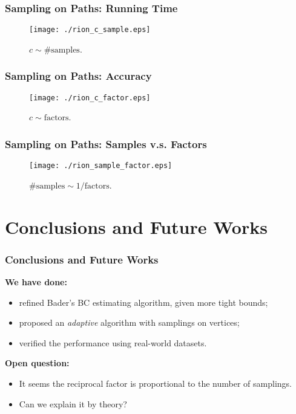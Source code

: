 \documentclass[12pt]{beamer}
\begin{document}
\begin{frame}
	\frametitle{Sampling on Paths: Running Time}
	\begin{figure}
	\texttt{[image: ./rion\_c\_sample.eps]}
\caption{$c \sim \textrm{\# samples}$.}
\end{figure}
\end{frame}

\begin{frame}
	\frametitle{Sampling on Paths: Accuracy}
	\begin{figure}
	\texttt{[image: ./rion\_c\_factor.eps]}
\caption{$c \sim \textrm{factors}$.}
\end{figure}
\end{frame}

\begin{frame}
	\frametitle{Sampling on Paths: Samples v.s. Factors}
	\begin{figure}
	\texttt{[image: ./rion\_sample\_factor.eps]}
\caption{$\textrm{\# samples} \sim 1/\textrm{factors}$.}
\end{figure}
\end{frame}

\section{Conclusions and Future Works}
\begin{frame}
	\frametitle{Conclusions and Future Works}
	{\bf We have done:}
	\begin{itemize}
		\item refined Bader's BC estimating algorithm, given more tight bounds;
		\item proposed an \emph{adaptive} algorithm with samplings on vertices;
		\item verified the performance using real-world datasets.
	\end{itemize}
	{\bf Open question:}
	\begin{itemize}
	 \item It seems the reciprocal factor is proportional to the number of samplings.
	\item Can we explain it by theory?
	\end{itemize}
\end{frame}
\end{document}
